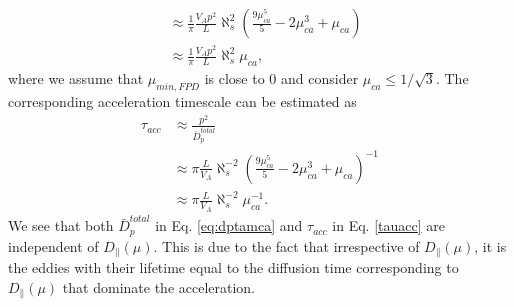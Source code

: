 \documentclass[preprint2,twocolumn,times,tighten]{aastex63}
\begin{document}
{\begin{equation}
\begin{aligned}
    & \approx  \frac{1}{\pi} \frac{V_A p^2}{L} \aleph_s^2 \left(\frac{9\mu_{ca}^5}{5}-2\mu_{ca}^3+\mu_{ca}\right)\\
    & \approx \frac{1}{\pi} \frac{V_A p^2}{L} \aleph_s^2 \mu_{ca},
\end{aligned}    
\end{equation}
{where we assume that $\mu_{min,FPD}$ is close to $0$ and consider $\mu_{ca}\leq 1/\sqrt{3}$.}
The corresponding acceleration timescale can be estimated as  
\begin{equation}\label{tauacc}
\begin{aligned}
    \tau_{acc} &\approx \frac{p^2}{\bar{D}_p^{total}} \\
    &\approx \pi \frac{L}{V_A}  \aleph_s^{-2} 
    \left(\frac{9\mu_{ca}^5}{5}-2\mu_{ca}^3+\mu_{ca}\right)^{-1}\\
    & \approx \pi \frac{L}{V_A} \aleph_s^{-2} \mu_{ca}^{-1}.
\end{aligned}
\end{equation}
{We see that both $\bar{D}_p^{total}$ in Eq. \eqref{eq:dptamca} and 
$\tau_{acc}$ in Eq. \eqref{tauacc} are independent of $D_{\|}(\mu)$.}
This is due to the fact that 
irrespective of $D_\|(\mu)$, it is the eddies with their lifetime equal to the diffusion time corresponding to $D_\|(\mu)$ that dominate the acceleration. 







}
\end{document}
